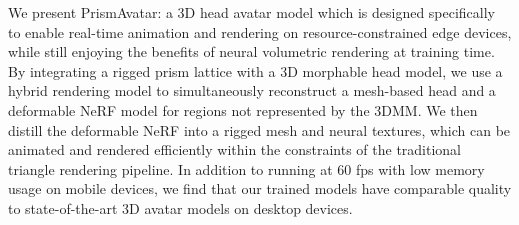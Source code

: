 We present PrismAvatar: a 3D head avatar model which is designed specifically to enable real-time animation and rendering on resource-constrained edge devices, while still enjoying the benefits of neural volumetric rendering at training time. 
By integrating a rigged prism lattice with a 3D morphable head model, we use a hybrid rendering model to simultaneously reconstruct a mesh-based head and a deformable NeRF model for regions not represented by the 3DMM. 
We then distill the deformable NeRF into a rigged mesh and neural textures, which can be animated and rendered efficiently within the constraints of the traditional triangle rendering pipeline. 
In addition to running at 60 fps with low memory usage on mobile devices, we find that our trained models have comparable quality to state-of-the-art 3D avatar models on desktop devices.